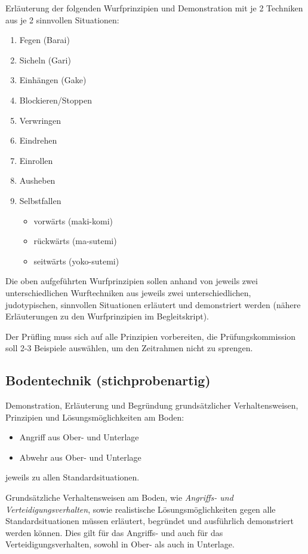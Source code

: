 \documentclass[justified, a4paper, notitlepage, captions=tableheading, nobib]{tufte-handout}
\begin{document}
Erläuterung der folgenden Wurfprinzipien und Demonstration mit je 2 Techniken aus je 2 sinnvollen Situationen:
\begin{enumerate}
\item Fegen (Barai)
\item Sicheln (Gari)
\item Einhängen (Gake)
\item Blockieren/Stoppen
\item Verwringen
\item Eindrehen
\item Einrollen
\item Ausheben
\item Selbstfallen
\begin{itemize}
\item vorwärts (maki-komi)
\item rückwärts (ma-sutemi)
\item seitwärts (yoko-sutemi)
\end{itemize}
\end{enumerate}

Die oben aufgeführten Wurfprinzipien sollen anhand von jeweils zwei unterschiedlichen Wurftechniken aus jeweils zwei unterschiedlichen, judotypischen, sinnvollen Situationen erläutert und demonstriert werden (nähere Erläuterungen zu den Wurfprinzipien im Begleitskript).

Der Prüfling muss sich auf alle Prinzipien vorbereiten, die Prüfungskommission soll 2-3 Beispiele auswählen, um den Zeitrahmen nicht zu sprengen.

\subsection{Bodentechnik (stichprobenartig)}
\label{sec:orgfd0a6e5}

Demonstration, Erläuterung und Begründung grundsätzlicher Verhaltensweisen, Prinzipien und Lösungsmöglichkeiten am Boden:
\begin{itemize}
\item Angriff aus Ober- und Unterlage
\item Abwehr aus Ober- und Unterlage
\end{itemize}
jeweils zu allen Standardsituationen.

Grundsätzliche Verhaltensweisen am Boden, wie \emph{Angriffs- und Verteidigungsverhalten}, sowie realistische Lösungsmöglichkeiten gegen alle Standardsituationen müssen erläutert, begründet und ausführlich demonstriert werden können. Dies gilt für das Angriffs- und auch für das Verteidigungsverhalten, sowohl in Ober- als auch in Unterlage. 
\end{document}
